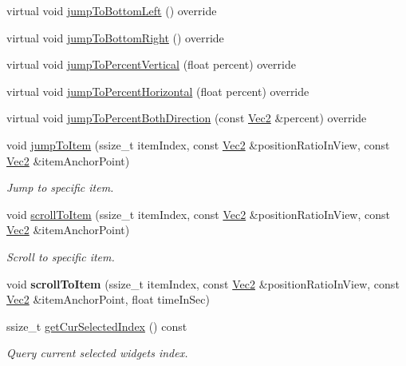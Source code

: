 \begin{DoxyCompactItemize}
virtual void \hyperlink{classui_1_1ListView_a001320a34234f830a4f35096ceb86d48}{jump\+To\+Bottom\+Left} () override
\item 
virtual void \hyperlink{classui_1_1ListView_a1147d7b2ad27eb3101bb6e31d1fe73e1}{jump\+To\+Bottom\+Right} () override
\item 
virtual void \hyperlink{classui_1_1ListView_a0c76de2de006a8e9eea7225df545622e}{jump\+To\+Percent\+Vertical} (float percent) override
\item 
virtual void \hyperlink{classui_1_1ListView_a783891312300a50f3b05ff15ea3f5b19}{jump\+To\+Percent\+Horizontal} (float percent) override
\item 
virtual void \hyperlink{classui_1_1ListView_ad6bbe89fde987d1bb2ead8de0bc688b5}{jump\+To\+Percent\+Both\+Direction} (const \hyperlink{classVec2}{Vec2} \&percent) override
\item 
void \hyperlink{classui_1_1ListView_a15d78fe1de4f989add6874266d153804}{jump\+To\+Item} (ssize\+\_\+t item\+Index, const \hyperlink{classVec2}{Vec2} \&position\+Ratio\+In\+View, const \hyperlink{classVec2}{Vec2} \&item\+Anchor\+Point)
\begin{DoxyCompactList}\small\item\em Jump to specific item. \end{DoxyCompactList}\item 
void \hyperlink{classui_1_1ListView_aeb284de1ebb4ae2e30c6c478d6e1d1a0}{scroll\+To\+Item} (ssize\+\_\+t item\+Index, const \hyperlink{classVec2}{Vec2} \&position\+Ratio\+In\+View, const \hyperlink{classVec2}{Vec2} \&item\+Anchor\+Point)
\begin{DoxyCompactList}\small\item\em Scroll to specific item. \end{DoxyCompactList}\item 
\mbox{\label{classui_1_1ListView_a7655f58119a990d51921f7b453bac14f}} 
void {\bfseries scroll\+To\+Item} (ssize\+\_\+t item\+Index, const \hyperlink{classVec2}{Vec2} \&position\+Ratio\+In\+View, const \hyperlink{classVec2}{Vec2} \&item\+Anchor\+Point, float time\+In\+Sec)
\item 
ssize\+\_\+t \hyperlink{classui_1_1ListView_a6efee3d32e83e99b248afd96dfbfef94}{get\+Cur\+Selected\+Index} () const
\begin{DoxyCompactList}\small\item\em Query current selected widget\textquotesingle{}s index. \end{DoxyCompactList}\item 

\end{DoxyCompactItemize}
